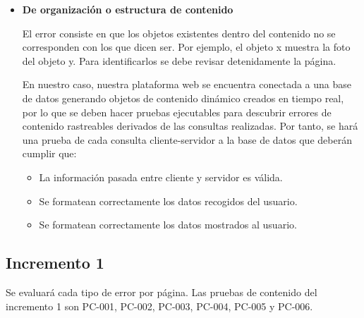 \begin{itemize}
\begin{itemize}
\end{itemize}

	

\item \textbf{De organización o estructura de contenido}


El error consiste en que los objetos existentes dentro del contenido no se corresponden con los que dicen ser. Por ejemplo, el objeto x muestra la foto del objeto y.
Para identificarlos se debe revisar detenidamente la página.



En nuestro caso, nuestra plataforma web se encuentra conectada a una base de datos generando objetos de contenido dinámico creados en tiempo real, por lo que se deben hacer pruebas ejecutables para descubrir errores de contenido rastreables derivados de las consultas realizadas. Por tanto, se hará una prueba de cada consulta cliente-servidor a la base de datos que deberán cumplir que:
\begin{itemize}
\item La información pasada entre cliente y servidor es válida.
\item Se formatean correctamente los datos recogidos del usuario.
\item Se formatean correctamente los datos mostrados al usuario.
\end{itemize}

\end{itemize}


\subsection{Incremento 1}


Se evaluará cada tipo de error por página. Las pruebas de contenido del incremento 1 son PC-001, PC-002, PC-003, PC-004, PC-005 y PC-006.

